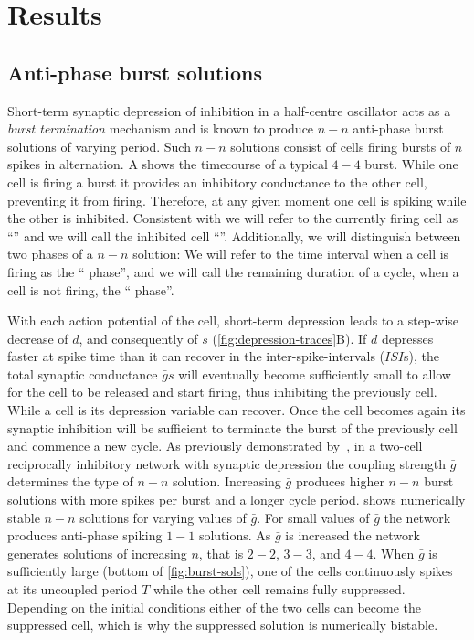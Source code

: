 \section{Results}
\subsection{Anti-phase burst solutions}
Short-term synaptic depression of inhibition in a half-centre oscillator acts as a \emph{burst termination} mechanism \citep{brown1911} and is known to produce $n-n$ anti-phase burst solutions of varying period.
Such $n-n$ solutions consist of cells firing bursts of $n$ spikes in alternation.
A shows the timecourse of a typical $4-4$ burst.
While one cell is firing a burst it provides an inhibitory conductance to the other cell,  preventing it from firing.
Therefore, at any given moment one cell is spiking while the other is inhibited. Consistent with \citet{bose2011} we will refer to the currently firing cell as ``\free{}'' and we will call the inhibited cell ``\suppressed{}''.
Additionally, we will distinguish between two phases of a $n-n$ solution:
We will refer to the time interval when a cell is firing as the ``\free{} phase'', and we will call the remaining duration of a cycle, when a cell is not firing, the ``\suppressed{}  phase''.

With each action potential of the \free{} cell, short-term depression leads to a step-wise decrease of $d$, and consequently of $s$ (\cref{fig:depression-traces}B).
If $d$ depresses faster at spike time than it can recover in the inter-spike-intervals ($ISI$s), the total synaptic conductance $\bar g s$ will eventually become sufficiently small to allow for the \suppressed{} cell to be released and start firing, thus inhibiting the previously \free{} cell.
While a cell is \suppressed{} its depression variable can recover.
Once the \suppressed{} cell becomes \free{} again its synaptic inhibition will be sufficient to terminate the burst of the previously \free{} cell and commence a new cycle.
As previously demonstrated by~\citet{bose2011}, in a two-cell reciprocally inhibitory network with synaptic depression the coupling strength $\bar g$ determines the type of $n-n$ solution.
Increasing $\bar g$ produces higher $n-n$ burst solutions with more spikes per burst and a longer cycle period.
 shows numerically stable $n-n$ solutions for varying values of $\bar g$.
For small values of $\bar g$ the network produces anti-phase spiking $1-1$ solutions.
As $\bar g$ is increased the network generates solutions of increasing $n$, that is $2-2$, $3-3$, and $4-4$.
When $\bar g$ is sufficiently large (bottom of \cref{fig:burst-sols}), one of the cells continuously spikes at its uncoupled period $T$ while the other cell remains fully suppressed.
Depending on the initial conditions either of the two cells can become the suppressed cell, which is why the suppressed solution is numerically bistable.

